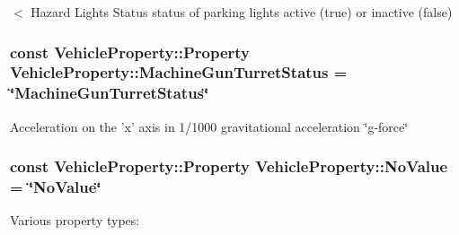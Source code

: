 $<$ Hazard Lights Status status of parking lights active (true) or inactive (false) \hypertarget{classVehicleProperty_a8b9faaa1094c2d162ed171a3063b7ffc}{
\subsubsection[{Machine\-Gun\-Turret\-Status}]{\setlength{\rightskip}{0pt plus 5cm}const Vehicle\-Property\-::\-Property Vehicle\-Property\-::\-Machine\-Gun\-Turret\-Status = \char`\"{}Machine\-Gun\-Turret\-Status\char`\"{}\hspace{0.3cm}{\ttfamily [static]}}}\label{classVehicleProperty_a8b9faaa1094c2d162ed171a3063b7ffc}
Acceleration on the 'x' axis in 1/1000 gravitational acceleration \char`\"{}g-\/force\char`\"{} \hypertarget{classVehicleProperty_ae013e9c1f3fb57d646211d3e6bb4ca9e}{
\subsubsection[{No\-Value}]{\setlength{\rightskip}{0pt plus 5cm}const Vehicle\-Property\-::\-Property Vehicle\-Property\-::\-No\-Value = \char`\"{}No\-Value\char`\"{}\hspace{0.3cm}{\ttfamily [static]}}}\label{classVehicleProperty_ae013e9c1f3fb57d646211d3e6bb4ca9e}


Various property types\-: 


